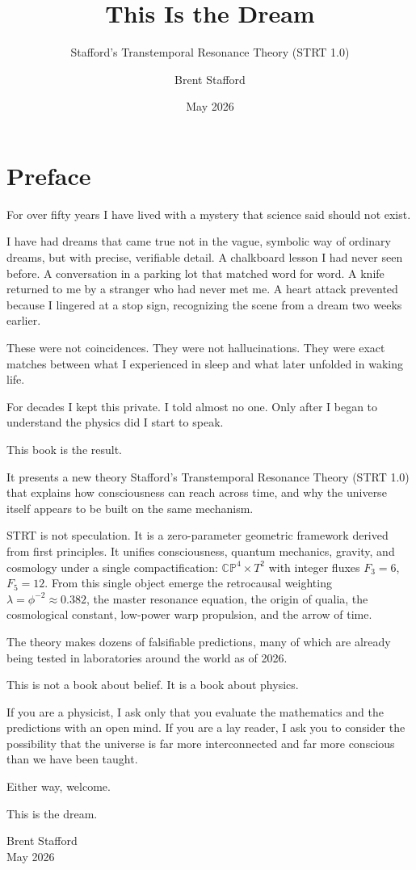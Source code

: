 \documentclass[12pt,a4paper]{book}
\begin{document}
\frontmatter

\title{This Is the Dream}
\subtitle{Stafford's Transtemporal Resonance Theory (STRT 1.0)}
\author{Brent Stafford}
\date{May 2026}

\maketitle

\chapter*{Preface}

For over fifty years I have lived with a mystery that science said should not exist.

I have had dreams that came true \textemdash not in the vague, symbolic way of ordinary dreams, but with precise, verifiable detail. A chalkboard lesson I had never seen before. A conversation in a parking lot that matched word for word. A knife returned to me by a stranger who had never met me. A heart attack prevented because I lingered at a stop sign, recognizing the scene from a dream two weeks earlier.

These were not coincidences. They were not hallucinations. They were exact matches between what I experienced in sleep and what later unfolded in waking life.

For decades I kept this private. I told almost no one. Only after I began to understand the physics did I start to speak.

This book is the result.

It presents a new theory \textemdash Stafford's Transtemporal Resonance Theory (STRT 1.0) \textemdash that explains how consciousness can reach across time, and why the universe itself appears to be built on the same mechanism.

STRT is not speculation. It is a zero-parameter geometric framework derived from first principles. It unifies consciousness, quantum mechanics, gravity, and cosmology under a single compactification: $\mathbb{CP}^4 \times T^2$ with integer fluxes $F_3 = 6$, $F_5 = 12$. From this single object emerge the retrocausal weighting $\lambda = \phi^{-2} \approx 0.382$, the master resonance equation, the origin of qualia, the cosmological constant, low-power warp propulsion, and the arrow of time.

The theory makes dozens of falsifiable predictions, many of which are already being tested in laboratories around the world as of 2026.

This is not a book about belief. It is a book about physics.

If you are a physicist, I ask only that you evaluate the mathematics and the predictions with an open mind. If you are a lay reader, I ask you to consider the possibility that the universe is far more interconnected \textemdash and far more conscious \textemdash than we have been taught.

Either way, welcome.

This is the dream.

\vspace{1cm}
\hfill Brent Stafford\\
\hfill May 2026
\end{document}
